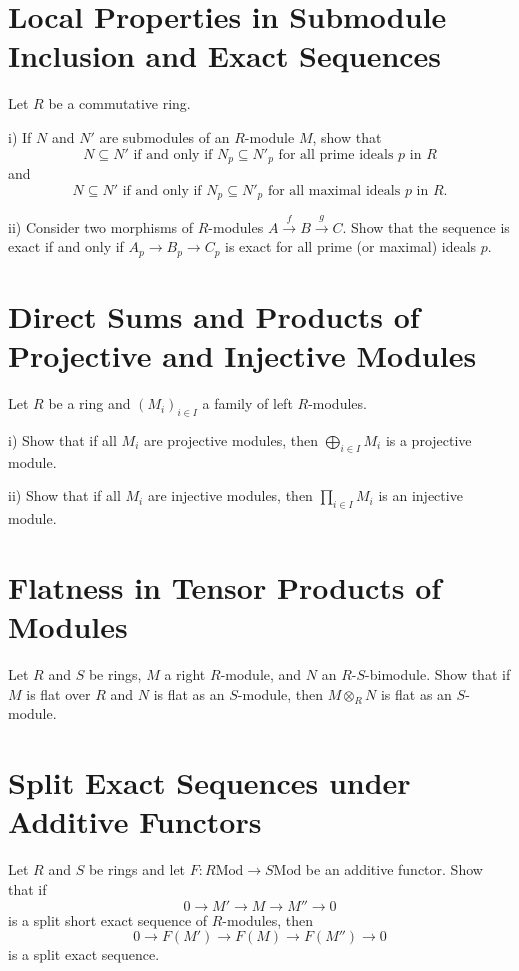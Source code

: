 \documentclass[lang=cn,11pt]{template}
\begin{document}
\section{Local Properties in Submodule Inclusion and Exact Sequences}
Let \( R \) be a commutative ring.

i) If \( N \) and \( N' \) are submodules of an \( R \)-module \( M \), show that
\[
N \subseteq N' \text{ if and only if } N_p \subseteq N'_p \text{ for all prime ideals } p \text{ in } R
\]
and
\[
N \subseteq N' \text{ if and only if } N_p \subseteq N'_p \text{ for all maximal ideals } p \text{ in } R.
\]

ii) Consider two morphisms of \( R \)-modules \( A \xrightarrow{f} B \xrightarrow{g} C \). Show that the sequence is exact if and only if \( A_p \rightarrow B_p \rightarrow C_p \) is exact for all prime (or maximal) ideals \( p \).

\section{Direct Sums and Products of Projective and Injective Modules}
Let \( R \) be a ring and \( (M_i)_{i \in I} \) a family of left \( R \)-modules.

i) Show that if all \( M_i \) are projective modules, then \( \bigoplus_{i \in I} M_i \) is a projective module.

ii) Show that if all \( M_i \) are injective modules, then \( \prod_{i \in I} M_i \) is an injective module.

\section{Flatness in Tensor Products of Modules}
Let \( R \) and \( S \) be rings, \( M \) a right \( R \)-module, and \( N \) an \( R \)-\( S \)-bimodule. Show that if \( M \) is flat over \( R \) and \( N \) is flat as an \( S \)-module, then \( M \otimes_R N \) is flat as an \( S \)-module.

\section{Split Exact Sequences under Additive Functors}
Let \( R \) and \( S \) be rings and let \( F : R\text{Mod} \rightarrow S\text{Mod} \) be an additive functor. Show that if
\[
0 \rightarrow M' \rightarrow M \rightarrow M'' \rightarrow 0
\]
is a split short exact sequence of \( R \)-modules, then
\[
0 \rightarrow F(M') \rightarrow F(M) \rightarrow F(M'') \rightarrow 0
\]
is a split exact sequence.
\end{document}
